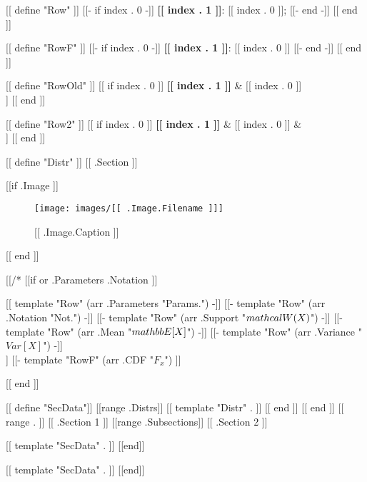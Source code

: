 [[ define "Row" ]]
[[- if index . 0 -]]
    {\color{darkblue} \textbf{[[ index . 1 ]]}:} {[[ index . 0 ]]};\hspace{0.5cm}
[[- end -]]
[[ end ]]

[[ define "RowF" ]]
[[- if index . 0 -]]
    {\color{darkblue} \textbf{[[ index . 1 ]]}:} {[[ index . 0 ]]}
[[- end -]]
[[ end ]]

[[ define "RowOld" ]]
[[ if index . 0 ]]
    \textbf{[[ index . 1 ]]} & {[[ index . 0 ]]} \\
[[ end ]]
[[ end ]]

[[ define "Row2" ]]
[[ if index . 0 ]]
    \textbf{[[ index . 1 ]]} & {[[ index . 0 ]]} & \\
[[ end ]]
[[ end ]]

[[ define "Distr" ]]
[[ .Section ]]

[[if .Image ]]
    \begin{figure}[H]
        \centering
        \texttt{[image: images/[[ .Image.Filename ]]]}
        \caption{[[ .Image.Caption ]]}
    \end{figure}
[[ end ]]

[[/* [[if or .Parameters .Notation ]]

    [[ template "Row" (arr .Parameters "Params.") -]]
    [[- template "Row" (arr .Notation "Not.") -]]
    [[- template "Row" (arr .Support "$\\mathcal{W}(X)$") -]]
    [[- template "Row" (arr .Mean "$\\mathbb{E}[X]$") -]]
    [[- template "Row" (arr .Variance "$Var[X]$") -]] \\
    [[- template "RowF" (arr .PDF "$f_x$") -]]
    [[- template "RowF" (arr .CDF "$F_x$") ]]


[[ end ]]

[[ define "SecData"]]
    [[range .Distrs]]
        [[ template "Distr" . ]]
    [[ end ]]
[[ end ]]
[[ range . ]]
    [[ .Section 1 ]]
        [[range .Subsections]]
            [[ .Section 2 ]]

            [[ template "SecData" . ]]
        [[end]]

        [[ template "SecData" . ]]
[[end]]